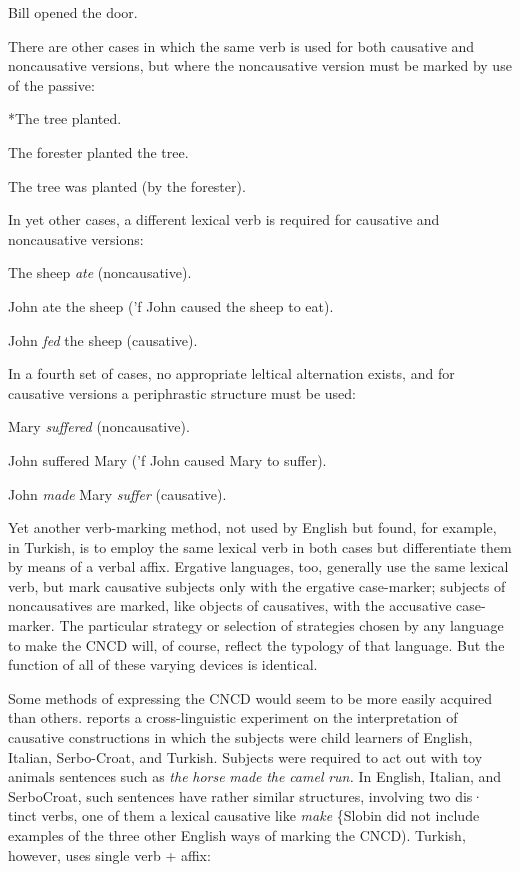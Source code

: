 \ea\label{ex:66}
 Bill opened the door.
\z

There are other cases in which the same verb is used for both causative and noncausative versions, but where the noncausative version must be marked by use of the passive:

\ea\label{ex:67}
 *The tree planted.
\glt
\z


\ea\label{ex:68}
 The forester planted the tree.
\z

\ea\label{ex:69}
The tree was planted (by the forester).
\z

In yet other cases, a different lexical verb is required for causative and noncausative versions:

\ea\label{ex:70}
 The sheep \textit{ate} (noncausative).
\z

\ea\label{ex:71}
 John ate the sheep ('f John caused the sheep to eat).
\z

\ea\label{ex:72}
 John \textit{fed} the sheep (causative). 
\z

In a fourth set of cases, no appropriate leltical alternation exists, and for causative versions a periphrastic structure must be used:

\ea\label{ex:73}
 Mary \textit{suffered} (noncausative).
\z

\ea\label{ex:74}
John suffered Mary ('f John caused Mary to suffer).
\z

\ea\label{ex:75}
 John \textit{made} Mary \textit{suffer} (causative). 
\z

Yet another verb-marking method, not used by English but found, for example, in Turkish, is to employ the same lexical verb in both cases but differentiate them by means of a verbal affix. Ergative languages, too, generally use the same lexical verb, but mark causative subjects only with the ergative case-marker; subjects of noncausatives are marked, like objects of causatives, with the accusative case-marker. The particular strategy or selection of strategies chosen by any lan\-guage to make the CNCD will, of course, reflect the typology of that language. But the function of all of these varying devices is identical.

Some methods of expressing the CNCD would seem to be more easily acquired than others. \citet{Slobin1978} reports a cross-linguistic experiment on the interpretation of causative constructions in which the subjects were child learners of English, Italian, Serbo-Croat, and Turkish. Subjects were required to act out with toy animals sentences such as \textit{the} \textit{horse} \textit{made} \textit{the} \textit{camel} \textit{run.} In English, Italian, and Serbo\-Croat, such sentences have rather similar structures, involving two dis· tinct verbs, one of them a lexical causative like \textit{make} \{Slobin did not
include examples of the three other English ways of marking the CNCD). Turkish, however, uses single verb + affix:

